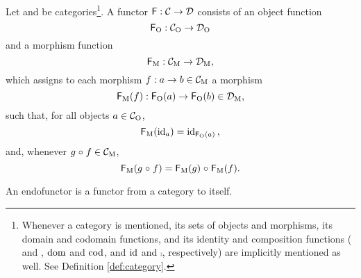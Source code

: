 \begin{definition}
  \label{def:functor}


  Let  and  be categories\footnote{Whenever a category
     is mentioned, its sets of objects and morphisms, its
    domain and codomain functions, and its identity and composition
    functions ( and , $\operatorname{dom}$ and $\operatorname{cod}$, and $\operatorname{id}$ and
    $\comp$, respectively) are implicitly mentioned as well. See
    Definition \ref{def:category}.}. A functor $\mathsf{F}: \mathcal{C} \to
  \mathcal{D}$ consists of an object function
  \begin{equation}
    \label{eq:functor-object}
    \mathsf{F}_{\operatorname{O}}: \mathcal{C}_{\operatorname{O}} \to \mathcal{D}_{\operatorname{O}}
  \end{equation}
  and a morphism function
  \begin{equation}
    \label{eq:functor-morphism}
    \mathsf{F}_{\operatorname{M}}: \mathcal{C}_{\operatorname{M}} \to \mathcal{D}_{\operatorname{M}}
    \text{,}
  \end{equation}
  which assigns to each morphism $f: a \to b \in \mathcal{C}_{\operatorname{M}}$ a morphism
  \begin{equation*}
    \mathsf{F}_{\operatorname{M}}(f): \mathsf{F}_{\operatorname{O}}(a) \to \mathsf{F}_{\operatorname{O}}(b) \in \mathcal{D}_{\operatorname{M}}
    \text{,}
  \end{equation*}
  such that, for all objects $a \in \mathcal{C}_{\operatorname{O}}$,
  \begin{equation}
    \label{eq:functor-identity}
    \mathsf{F}_{\operatorname{M}}(\operatorname{id}_{a}) = \operatorname{id}_{\mathsf{F}_{\operatorname{O}}(a)}
    \text{,}
  \end{equation}
  and, whenever $g \mathrel{\circ} f \in \mathcal{C}_{\operatorname{M}}$,
  \begin{equation}
    \label{eq:functor-composition}
    \mathsf{F}_{\operatorname{M}}(g \mathrel{\circ} f) = \mathsf{F}_{\operatorname{M}}(g) \mathrel{\circ} \mathsf{F}_{\operatorname{M}}(f)
    \text{.}
  \end{equation}

\end{definition}

\begin{definition}
  \label{def:endofunctor}

  An endofunctor is a functor from a category to itself.

\end{definition}

